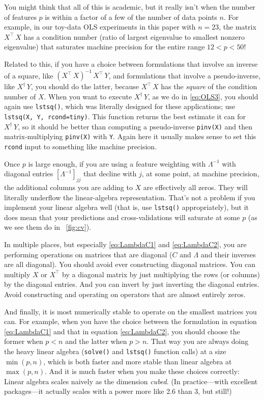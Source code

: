 \documentclass[12pt,letterpaper]{article}
\newcommand{\code}[1]{\texttt{#1}}
\begin{document}
You might think that all of this is academic, but it really isn't when the number of features $p$ is within a factor of a few of the number of data points $n$.
For example, in our toy-data OLS experiments in this paper with $n=23$, the matrix $X^\top\,X$ has a condition number (ratio of largest eigenvalue to smallest nonzero eigenvalue) that saturates machine precision for the entire range $12 < p < 50$!

Related to this, if you have a choice between formulations that involve an inverse of a square, like $(X^\top\,X)^{-1}\,X^\top\,Y$, and formulations that involve a pseudo-inverse, like $X^\dagger\,Y$, you should do the latter, because $X^\top\,X$ has the \emph{square} of the condition number of $X$.
When you want to execute $X^\dagger\,Y$, as we do in \eqref{eq:OLS3}, you should again use \code{lstsq()}, which was literally designed for these applications; use \code{lstsq(X, Y, rcond=tiny)}.
This function returns the best estimate it can for $X^\dagger\,Y$, so
it should be better than computing a pseudo-inverse \code{pinv(X)} and then matrix-multiplying \code{pinv(X)} with \code{Y}.
Again here it usually makes sense to set this \code{rcond} input to something like machine precision.

Once $p$ is large enough, if you are using a feature weighting with $\Lambda^{-1}$ with diagonal entries $[\Lambda^{-1}]_{jj}$ that decline with $j$, at some point, at machine precision, the additional columns you are adding to $X$ are effectively all zeros.
They will literally underflow the linear-algebra representation.
That's not a problem if you implement your linear algebra well (that is, use \code{lstsq()} appropriately), but it does mean that your predictions and cross-validations will saturate at some $p$ (as we see them do in \figurename~\ref{fig:cv}).

In multiple places, but especially \eqref{eq:LambdaC1} and \eqref{eq:LambdaC2}, you are performing operations on matrices that are diagonal ($C$ and $\Lambda$ and their inverses are all diagonal).
You should avoid ever constructing diagonal matrices.
You can multiply $X$ or $X^\top$ by a diagonal matrix by just multiplying the rows (or columns) by the diagonal entries.
And you can invert by just inverting the diagonal entries.
Avoid constructing and operating on operators that are almost entirely zeros.

And finally, it is most numerically stable to operate on the smallest matrices you can.
For example, when you have the choice between the formulation in equation \eqref{eq:LambdaC1} and that in equation \eqref{eq:LambdaC2}, you should choose the former when $p<n$ and the latter when $p>n$.
That way you are always doing the heavy linear algebra (\code{solve()} and \code{lstsq()} function calls) at a size $\min(p, n)$, which is both faster and more stable than linear algebra at $\max(p, n)$. And it is much faster when you make these choices correctly:
Linear algebra scales naively as the dimension \emph{cubed}.
(In practice---with excellent packages---it actually scales with a power more like 2.6 than 3, but still!)
\end{document}
